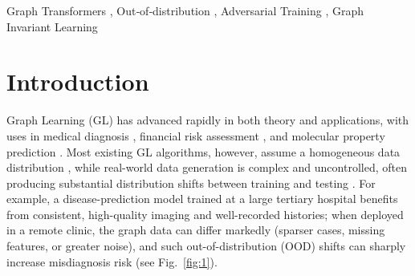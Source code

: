 \documentclass[a4paper,fleqn]{cas-dc}
\begin{document}
\begin{keywords}
Graph Transformers \sep 
Out‑of‑distribution \sep 
Adversarial Training \sep 
Graph Invariant Learning
\end{keywords}

\maketitle

\section{Introduction}\label{}

Graph Learning (GL) \cite{ZHANG2024112488,yu2023towards} has advanced rapidly in both theory and applications, with uses in medical diagnosis \cite{ahmedt2021graph}, financial risk assessment \cite{sun2024research}, and molecular property prediction \cite{zang2023hierarchical}. Most existing GL algorithms, however, assume a homogeneous data distribution \cite{yu2023towards}, while real-world data generation is complex and uncontrolled, often producing substantial distribution shifts between training and testing \cite{hu2020open,ji2023drugood,koh2021wilds}. For example, a disease-prediction model trained at a large tertiary hospital benefits from consistent, high-quality imaging and well-recorded histories; when deployed in a remote clinic, the graph data can differ markedly (sparser cases, missing features, or greater noise), and such out-of-distribution (OOD) shifts can sharply increase misdiagnosis risk (see Fig.~\ref{fig:1}).
\end{document}

